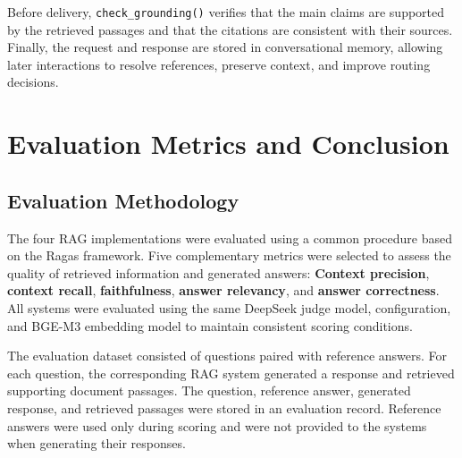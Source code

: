\documentclass[a4paper,12pt]{report}
\begin{document}
Before delivery, \texttt{check\_grounding()} verifies that the main claims are supported by the retrieved passages and that the citations are consistent with their sources. Finally, the request and response are stored in conversational memory, allowing later interactions to resolve references, preserve context, and improve routing decisions.







































\chapter{Evaluation Metrics and Conclusion}

\section{Evaluation Methodology}
\label{sec:evaluation_methodology}

The four RAG implementations were evaluated using a common procedure
based on the Ragas framework. Five complementary metrics were selected
to assess the quality of retrieved information and generated answers:
\textbf{Context precision}, \textbf{context recall}, \textbf{faithfulness}, \textbf{answer relevancy},
and \textbf{answer correctness}. All systems were evaluated using the same
DeepSeek judge model, configuration, and BGE-M3 embedding model to
maintain consistent scoring conditions.

The evaluation dataset consisted of questions paired with reference
answers. For each question, the corresponding RAG system generated a
response and retrieved supporting document passages. The question,
reference answer, generated response, and retrieved passages were
stored in an evaluation record. Reference answers were used only
during scoring and were not provided to the systems when generating
their responses.
\end{document}
